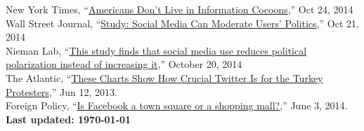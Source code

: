 \documentclass[margin,line,11pt]{resume}
\newcommand{\nl}{\vspace{0.10in}\\}
\begin{document}
\begin{resume}
New York Times, ``\href{http://www.nytimes.com/2014/10/25/upshot/americans-dont-live-in-information-cocoons.html?_r=0}{Americans Don't Live in Information Cocoons},'' Oct 24, 2014\nl
Wall Street Journal, ``\href{http://blogs.wsj.com/washwire/2014/10/21/study-social-media-can-moderate-users-politics/}{Study: Social Media Can Moderate Users' Politics},'' Oct 21, 2014\nl
Nieman Lab, ``\href{http://www.niemanlab.org/2014/10/this-study-finds-that-social-media-use-reduces-political-polarization-instead-of-increasing-it/}{This study finds that social media use reduces political polarization instead of increasing it},'' October 20, 2014\nl
The Atlantic, ``\href{http://www.theatlantic.com/international/archive/2013/06/these-charts-show-how-crucial-twitter-is-for-the-turkey-protesters/276798/}{These Charts Show How Crucial Twitter Is for the Turkey Protesters},'' Jun 12, 2013.\nl
Foreign Policy, ``\href{http://foreignpolicy.com/2013/06/03/is-facebook-a-town-square-or-a-shopping-mall/}{Is Facebook a town square or a shopping mall?},'' June 3, 2014.\nl

\centering \textbf{Last updated: \today}
    
\end{resume}
\end{document}
